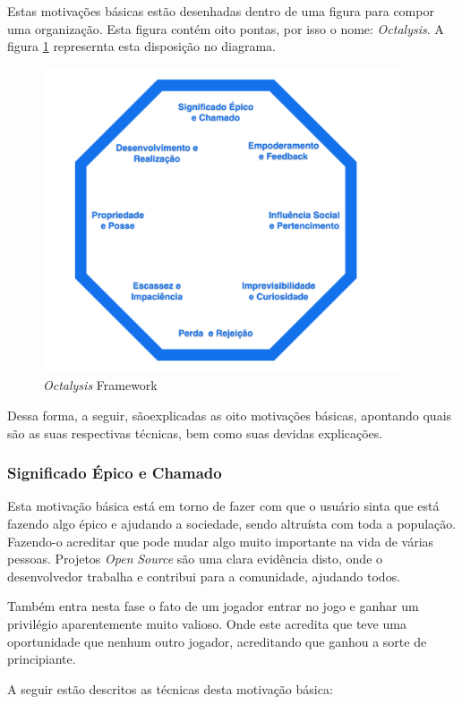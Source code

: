 Estas motivações básicas estão desenhadas dentro de uma figura para
compor uma organização. Esta figura contém oito pontas, por isso o nome:
\textit{Octalysis}. A figura \ref{fig:octalysisframework} represernta esta
disposição no diagrama.

\begin{figure}[h]
    \centering
    \includegraphics[width=400px, scale=1]{figuras/octalysisframework}
    \caption{\textit{Octalysis} Framework}
    \label{fig:octalysisframework}
\end{figure}

Dessa forma, a seguir, sãoexplicadas as oito motivações básicas,
apontando quais são as suas respectivas técnicas, bem como
suas devidas explicações.

\subsubsection{Significado Épico e Chamado}
\label{sub:significadoepico}
Esta motivação básica está em torno de fazer com que o usuário sinta que
está fazendo algo épico e ajudando a sociedade, sendo altruísta com toda
a população. Fazendo-o acreditar que pode mudar algo muito importante
na vida de várias pessoas. Projetos \textit{Open} \textit{Source} são uma clara evidência
disto, onde o desenvolvedor trabalha e contribui para a comunidade, ajudando
todos.

Também entra nesta fase o fato de um jogador entrar no jogo e ganhar um
privilégio aparentemente muito valioso. Onde este acredita que teve uma
oportunidade que nenhum outro jogador, acreditando que ganhou a sorte de
principiante.

A seguir estão descritos as técnicas desta motivação básica:

